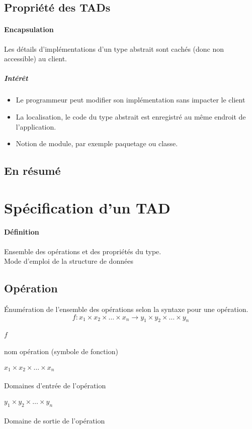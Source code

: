 	\subsection{Propriété des TADs}
		\paragraph{Encapsulation} 
			Les détails d'implémentations d'un type abstrait sont cachés (donc non accessible) au client.\\
			\subparagraph{Intérêt}			
				\begin{itemize}
					\item  Le programmeur peut modifier son implémentation sans impacter le client
					\item La localisation, le code du type abstrait est enregistré au même endroit de l'application.
					\item Notion de module, par exemple paquetage ou classe.
				\end{itemize}
	\subsection{En résumé}
			
\section{Spécification d'un TAD}
	\paragraph{Définition} 
		Ensemble des opérations et des propriétés du type. \\
		Mode d'emploi de la structure de données
	\subsection{Opération}
		Énumération de l'ensemble des opérations selon la syntaxe pour une opération.
		$$ f: x_{1} \times x_{2} \times \dots \times x_{n} \rightarrow y_{1} \times y_{2} \times \dots \times y_{n}$$
		\paragraph{$f$} nom opération (symbole de fonction)
		\paragraph{$x_{1} \times x_{2} \times \dots \times x_{n}$} Domaines d'entrée de l'opération
		\paragraph{$y_{1} \times y_{2} \times \dots \times y_{n}$} Domaine de sortie de l'opération
